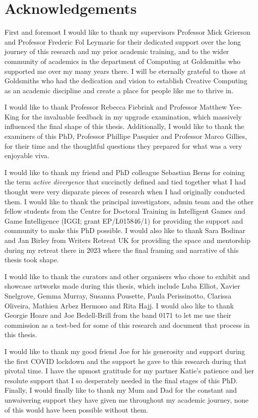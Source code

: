 \chapter*{Acknowledgements}

First and foremost I would like to thank my supervisors Professor Mick Grierson and Professor Frederic Fol Leymarie for their dedicated support over the long journey of this research and my prior academic training, and to the wider community of academics in the department of Computing at Goldsmiths who supported me over my many years there. I will be eternally grateful to those at Goldsmiths who had the dedication and vision to establish Creative Computing as an academic discipline and create a place for people like me to thrive in. 

I would like to thank Professor Rebecca Fiebrink and Professor Matthew Yee-King for the invaluable feedback in my upgrade examination, which massively influenced the final shape of this thesis. Additionally, I would like to thank the examiners of this PhD, Professor Phillipe Pasquier and Professor Marco Gillies, for their time and the thoughtful questions they prepared for what was a very enjoyable viva. 

I would like to thank my friend and PhD colleague Sebastian Berns for coining the term \textit{active divergence} that succinctly defined and tied together what I had thought were very disparate pieces of research when I had originally conducted them. I would like to thank the principal investigators, admin team and the other fellow students from the Centre for Doctoral Training in Intelligent Games and Game Intelligence (IGGI; grant EP/L015846/1) for providing the support and community to make this PhD possible. I would also like to thank Sara Bodinar and Jan Birley from Writers Retreat UK for providing the space and mentorship during my retreat there in 2023 where the final framing and narrative of this thesis took shape. 

I would like to thank the curators and other organisers who chose to exhibit and showcase artworks made during this thesis, which include Luba Elliot, Xavier Snelgrove, Gemma Murray, Susanna Pousette, Paula Perissinotto, Clarissa Oliveira, Mathieu Arbez Hermoso and Rita Hajj. I would also like to thank Georgie Hoare and Joe Bedell-Brill from the band 0171 to let me use their commission as a test-bed for some of this research and document that process in this thesis.

I would like to thank my good friend Joe for his generosity and support during the first COVID lockdown and the support he gave to this research during that pivotal time. I have the upmost gratitude for my partner Katie's patience and her resolute support that I so desperately needed in the final stages of this PhD. Finally, I would finally like to thank my Mum and Dad for the constant and unwaivering support they have given me throughout my academic journey, none of this would have been possible without them. 

